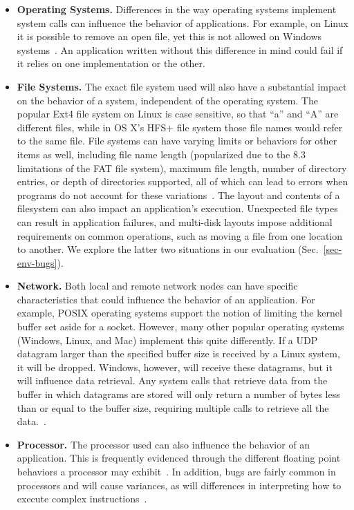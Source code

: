 \begin{itemize}

\item {\bf Operating Systems.} Differences in the way operating systems
implement system calls can influence the behavior of applications.  For
example, on Linux it is possible to remove an open file, yet this is not
allowed on Windows systems~\cite{UnlinkStandard}.  An application
written without this difference in mind could fail if it relies on one
implementation or the other.

\item {\bf File Systems.}  The exact file system used will also have a
substantial impact on the behavior of a system, independent of the
operating system.  The popular Ext4 file system on Linux is case sensitive,
so that ``a'' and ``A'' are different files,
while in OS X's HFS+ file system
those file names would refer to the same file.
File systems can have varying limits or behaviors for other items as well,
including file name length (popularized due to the 8.3 limitations of the
FAT file system), maximum file length, number of directory entries, or
depth
of directories supported, all of which can lead to errors when programs
do not account for these variations~\cite{EXT4Layout, AppleHFS}.
The layout and contents of a filesystem can also impact an application's
execution.  Unexpected file types can result in application
failures, and multi-disk layouts impose additional requirements on
common operations, such as moving a file from one location to
another.
        We explore the latter two situations in our
        evaluation (Sec.~\ref{sec-env-bugs}).

\item {\bf Network.} Both local and remote network nodes
can have specific characteristics that could influence the behavior of an
application.
For example, POSIX operating
systems support the notion of limiting the kernel buffer set aside for a
socket.  However, many other popular operating
systems (Windows, Linux, and Mac)
implement this quite differently.
If a UDP datagram
larger than the specified buffer size is received by a Linux system,
it will be dropped.
Windows,
however,
will receive these datagrams,
but it will influence data retrieval.
Any system calls that retrieve data from the buffer in which
datagrams are
stored will only return a number of bytes less than or equal to the
buffer size, requiring multiple calls
to retrieve all the data.~\cite{Zhuang_NSDI_2014}.

\item {\bf Processor.}  The processor used can also influence the
behavior of an application.  This is frequently
evidenced through the different floating point behaviors a
processor may exhibit~\cite{ArbitraryPrecision}.
In addition, bugs are fairly common
in processors and will cause variances, as will
differences in interpreting
how to execute complex instructions~\cite{Microarch}.

\end{itemize}

